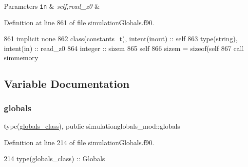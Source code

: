 \begin{DoxyParams}[1]{Parameters}
\mbox{\tt in}  & {\em self,read\+\_\+z0} & \\
\hline
\end{DoxyParams}


Definition at line 861 of file simulation\+Globals.\+f90.


\begin{DoxyCode}
861     \textcolor{keywordtype}{implicit none}
862     \textcolor{keywordtype}{class}(constants\_t), \textcolor{keywordtype}{intent(inout)} :: self
863     \textcolor{keywordtype}{type}(string), \textcolor{keywordtype}{intent(in)} :: read\_z0
864     \textcolor{keywordtype}{integer} :: sizem
865     self%
866     sizem = sizeof(self%
867     \textcolor{keyword}{call }simmemory%
\end{DoxyCode}


\subsection{Variable Documentation}
\mbox{\label{namespacesimulationglobals__mod_acf1e2786d81bd0fe337a8458efce8733}} 
\subsubsection{\texorpdfstring{globals}{globals}}
{\footnotesize\ttfamily type(\mbox{\hyperlink{structsimulationglobals__mod_1_1globals__class}{globals\+\_\+class}}), public simulationglobals\+\_\+mod\+::globals}



Definition at line 214 of file simulation\+Globals.\+f90.


\begin{DoxyCode}
214     \textcolor{keywordtype}{type}(globals\_class) :: Globals
\end{DoxyCode}
